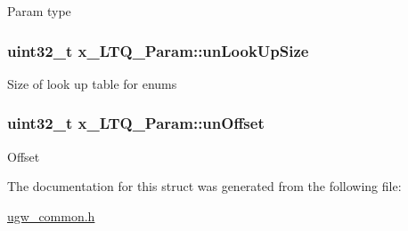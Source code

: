 Param type \hypertarget{structx__LTQ__Param_a33e8fa5cc148e6b0aa51cf67423d0d4e}{
\subsubsection[{un\-Look\-Up\-Size}]{\setlength{\rightskip}{0pt plus 5cm}uint32\-\_\-t x\-\_\-\-L\-T\-Q\-\_\-\-Param\-::un\-Look\-Up\-Size}}\label{structx__LTQ__Param_a33e8fa5cc148e6b0aa51cf67423d0d4e}
Size of look up table for enums \hypertarget{structx__LTQ__Param_a654550468915b45a7b78e570e741baf2}{
\subsubsection[{un\-Offset}]{\setlength{\rightskip}{0pt plus 5cm}uint32\-\_\-t x\-\_\-\-L\-T\-Q\-\_\-\-Param\-::un\-Offset}}\label{structx__LTQ__Param_a654550468915b45a7b78e570e741baf2}
Offset 

The documentation for this struct was generated from the following file\-:\begin{DoxyCompactItemize}
\item 
\hyperlink{ugw__common_8h}{ugw\-\_\-common.\-h}\end{DoxyCompactItemize}
